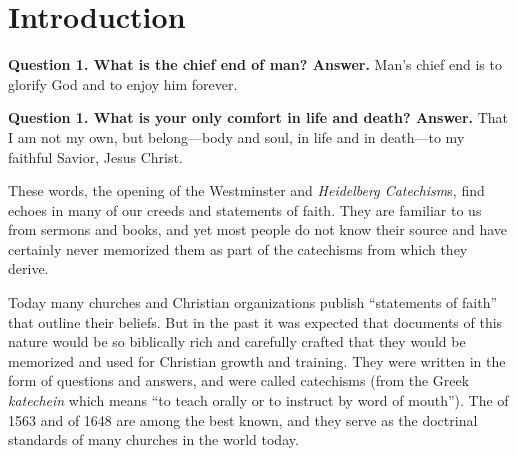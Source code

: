 \documentclass[]{memoir}
\begin{document}
\tableofcontents

\cleardoublepage

\pagestyle{myPageStyle}

\mainmatter

\chapter{Introduction}

\hspace{3ex}\textbf{Question 1. What is the chief end of man?\newline
Answer.} Man's chief end is to glorify God and to enjoy him forever.

\textbf{Question 1. What is your only comfort in life and death?\newline
Answer.} That I am not my own, but belong\thinspace{}---\thinspace{}body and soul, in life and in death\thinspace{}---\thinspace{}to my faithful Savior, Jesus Christ.

\smallskip

These words, the opening of the Westminster and {\em Heidelberg Catechism}s, find echoes in many of our creeds and statements of faith. They are familiar to us from sermons and books, and yet most people do not know their source and have certainly never memorized them as part of the catechisms from which they derive.

Today many churches and Christian organizations publish ``statements of faith'' that outline their beliefs. But in the past it was expected that documents of this nature would be so biblically rich and carefully crafted that they would be memorized and used for Christian growth and training. They were written in the form of questions and answers, and were called catechisms (from the Greek {\em katechein}\/ which means ``to teach orally or to instruct by word of mouth''). The \/ of 1563 and \/ of 1648 are among the best known, and they serve as the doctrinal standards of many churches in the world today.
\end{document}
